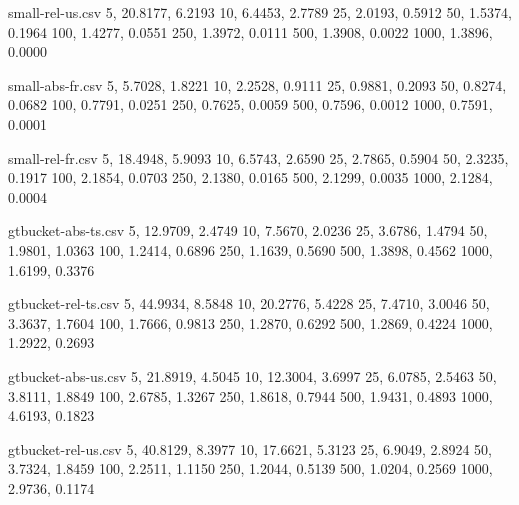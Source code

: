\begin{filecontents*}[overwrite]{small-rel-us.csv}
5,    20.8177, 6.2193
10,   6.4453, 2.7789
25,   2.0193, 0.5912
50,   1.5374, 0.1964
100,  1.4277, 0.0551
250,  1.3972, 0.0111
500,  1.3908, 0.0022
1000, 1.3896, 0.0000
\end{filecontents*}

\begin{filecontents*}[overwrite]{small-abs-fr.csv}
5,    5.7028, 1.8221
10,   2.2528, 0.9111
25,   0.9881, 0.2093
50,   0.8274, 0.0682
100,  0.7791, 0.0251
250,  0.7625, 0.0059
500,  0.7596, 0.0012
1000, 0.7591, 0.0001
\end{filecontents*}

\begin{filecontents*}[overwrite]{small-rel-fr.csv}
5,    18.4948, 5.9093
10,   6.5743, 2.6590
25,   2.7865, 0.5904
50,   2.3235, 0.1917
100,  2.1854, 0.0703
250,  2.1380, 0.0165
500,  2.1299, 0.0035
1000, 2.1284, 0.0004
\end{filecontents*}


\begin{filecontents*}[overwrite]{gtbucket-abs-ts.csv}
5,    12.9709, 2.4749
10,    7.5670, 2.0236
25,    3.6786, 1.4794
50,    1.9801, 1.0363
100,   1.2414, 0.6896
250,   1.1639, 0.5690
500,   1.3898, 0.4562
1000,  1.6199, 0.3376
\end{filecontents*}

\begin{filecontents*}[overwrite]{gtbucket-rel-ts.csv}
5,    44.9934, 8.5848
10,   20.2776, 5.4228
25,    7.4710, 3.0046
50,    3.3637, 1.7604
100,   1.7666, 0.9813
250,   1.2870, 0.6292
500,   1.2869, 0.4224
1000,  1.2922, 0.2693
\end{filecontents*}

\begin{filecontents*}[overwrite]{gtbucket-abs-us.csv}
5,    21.8919, 4.5045
10,   12.3004, 3.6997
25,    6.0785, 2.5463
50,    3.8111, 1.8849
100,   2.6785, 1.3267
250,   1.8618, 0.7944
500,   1.9431, 0.4893
1000,  4.6193, 0.1823
\end{filecontents*}

\begin{filecontents*}[overwrite]{gtbucket-rel-us.csv}
5,    40.8129, 8.3977
10,   17.6621, 5.3123
25,    6.9049, 2.8924
50,    3.7324, 1.8459
100,   2.2511, 1.1150
250,   1.2044, 0.5139
500,   1.0204, 0.2569
1000,  2.9736, 0.1174
\end{filecontents*}

